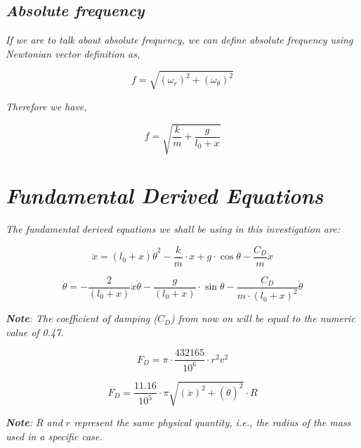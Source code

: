     \subsection{\textit{Absolute frequency}}
                
        \textit{If we are to talk about absolute frequency, we can define absolute frequency using Newtonian vector definition as,}
                
            $$f = \sqrt{\left(\omega_r\right)^2 + \left(\omega_\theta\right)^2}$$
                
        \textit{Therefore we have,}
                
            $$f = \sqrt{\frac{k}{m} + \frac{g}{l_0 + x}}$$



\section{\textit{Fundamental Derived Equations}}
\textit{The fundamental derived equations we shall be using in this investigation are:}
            
    \begin{equation}
        \ddot{x} = (l_0+x)\dot{\theta}^2 - \frac{k}{m}\cdot x + g\cdot\cos{\theta} - \frac{C_D}{m}\dot{x}
        \label{eq1}
    \end{equation}
            
    \begin{equation}
        \ddot{\theta} = - \frac{2}{(l_0+x)}\dot{x}\dot{\theta} - \frac{g}{(l_0+x)}\cdot\sin{\theta} - \frac{C_D}{m\cdot(l_0+x)^2}\dot{\theta}
    \label{eq2}
    \end{equation}
            
        \textit{\textbf{Note}: The coefficient of damping ($C_D$) from now on will be equal to the numeric value of 0.47.}
            
    \begin{equation}
        F_D = \pi\cdot\frac{432165}{10^{6}}\cdot r^2v^2
        \label{eq3}
    \end{equation}
            
    \begin{equation}
        F_D = \frac{11.16}{10^{5}}\cdot\pi\sqrt{(\ddot{x})^2 + (\ddot{\theta})^2}\cdot R
        \label{eq4}
    \end{equation}
            
        \textit{\textbf{Note}: $R$ and $r$ represent the same physical quantity, i.e., the radius of the mass used in a specific case.}
            
